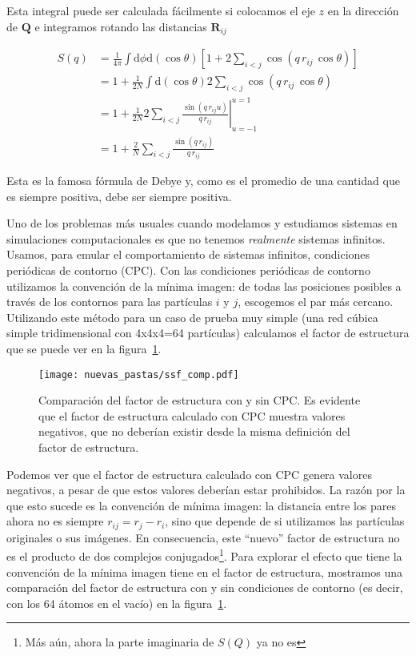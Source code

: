 Esta integral puede ser calculada fácilmente si colocamos el eje $z$ en la dirección de $\mathbf{Q}$ e integramos rotando las distancias $\mathbf{R}_{ij}$

\begin{align*}
  S(q) &= \frac{1}{4\pi}\int\text{d}\phi\text{d}(\cos\theta)
  \left[1 + 2\sum_{i < j}\cos\left(q\,r_{ij}\,\cos\theta\right)\right]\\
  &= 1 + \frac{1}{2N}\int\text{d}(\cos\theta)
  2\sum_{i < j}\cos\left(q\,r_{ij}\,\cos\theta\right)\\
  &= 1 + \frac{1}{2N} 2 \sum_{i < j} \left.\frac{\sin(q\,r_{ij}u)}{q\,r_{ij}}\right|_{u=-1}^{u=1}\\
  &= 1 + \frac{2}{N} \sum_{i < j}\frac{\sin(q\,r_{ij})}{q\,r_{ij}}
\end{align*}

Esta es la famosa fórmula de Debye y, como es el promedio de una cantidad que es siempre positiva, debe ser siempre positiva.

Uno de los problemas más usuales cuando modelamos y estudiamos sistemas en simulaciones computacionales es que no tenemos \emph{realmente} sistemas infinitos.
Usamos, para emular el comportamiento de sistemas infinitos, condiciones periódicas de contorno (CPC).
Con las condiciones periódicas de contorno utilizamos la convención de la mínima imagen: de todas las posiciones posibles a través de los contornos para las partículas $i$ y $j$, escogemos el par más cercano.
Utilizando este método para un caso de prueba muy simple (una red cúbica simple tridimensional con 4x4x4=64 partículas) calculamos el factor de estructura que se puede ver en la figura~\ref{fig:ssf_comp}.

\begin{figure}
  \centering
  \texttt{[image: nuevas\_pastas/ssf\_comp.pdf]}
  \caption{Comparación del factor de estructura con y sin CPC.
    Es evidente que el factor de estructura calculado con CPC muestra valores negativos, que no deberían existir desde la misma definición del factor de estructura.}
  \label{fig:ssf_comp}
\end{figure}

Podemos ver que el factor de estructura calculado con CPC genera valores negativos, a pesar de que estos valores deberían estar prohibidos.
La razón por la que esto sucede es la convención de mínima imagen: la distancia entre los pares ahora no es siempre $r_{ij} = r_j - r_i$, sino que depende de si utilizamos las partículas originales o sus imágenes.
En consecuencia, este ``nuevo'' factor de estructura no es el producto de dos complejos conjugados\footnote{Más aún, ahora la parte imaginaria de $S(Q)$ ya no es}.
Para explorar el efecto que tiene la convención de la mínima imagen tiene en el factor de estructura, mostramos una comparación del factor de estructura con y sin condiciones de contorno (es decir, con los 64 átomos en el vacío) en la figura~\ref{fig:ssf_comp}.

